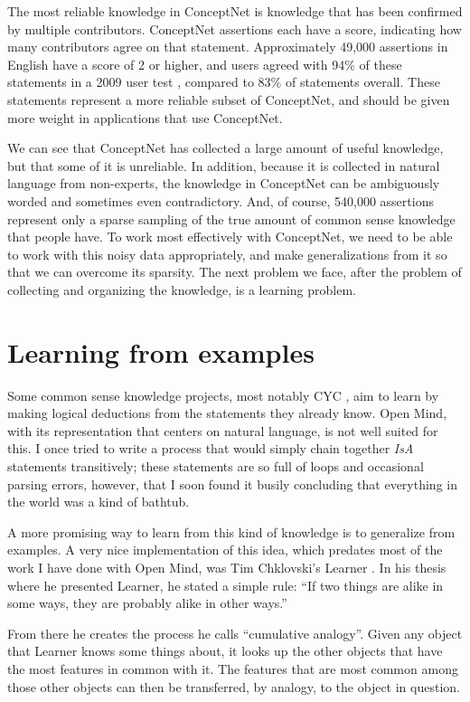 \documentclass[11pt]{article}
\begin{document}
The most reliable knowledge in ConceptNet is knowledge that has been confirmed
by multiple contributors. ConceptNet assertions each have a score, indicating
how many contributors agree on that statement. Approximately 49,000 assertions
in English have a score of 2 or higher, and users agreed with 94\% of these
statements in a 2009 user test \cite{ieee}, compared to 83\% of statements
overall. These statements represent a more reliable subset of ConceptNet, and should be given more weight in applications that use ConceptNet.

We can see that ConceptNet has collected a large amount of useful knowledge,
but that some of it is unreliable. In addition, because it is collected in
natural language from non-experts, the knowledge in ConceptNet can be
ambiguously worded and sometimes even contradictory. And, of course, 540,000
assertions represent only a sparse sampling of the true amount of common sense
knowledge that people have. To work most effectively with ConceptNet, we need
to be able to work with this noisy data appropriately, and make generalizations
from it so that we can overcome its sparsity. The next problem we face, after
the problem of collecting and organizing the knowledge, is a learning problem.

\section{Learning from examples}

Some common sense knowledge projects, most notably CYC \cite{cyc}, aim to learn
by making logical deductions from the statements they already know. Open Mind,
with its representation that centers on natural language, is not well suited
for this. I once tried to write a process that would simply chain together {\em
IsA} statements transitively; these statements are so full of loops and
occasional parsing errors, however, that I soon found it busily concluding that
everything in the world was a kind of bathtub.

A more promising way to learn from this kind of knowledge is to generalize from
examples. A very nice implementation of this idea, which predates most of the
work I have done with Open Mind, was Tim Chklovski's {\sc Learner}
\cite{learner}. In his thesis where he presented {\sc Learner}, he stated a
simple rule: ``If two things are alike in some ways, they are probably alike in
other ways.''

From there he creates the process he calls ``cumulative analogy''. Given any
object that {\sc Learner} knows some things about, it looks up the other
objects that have the most features in common with it. The features that are
most common among those other objects can then be transferred, by analogy, to
the object in question.
\end{document}
